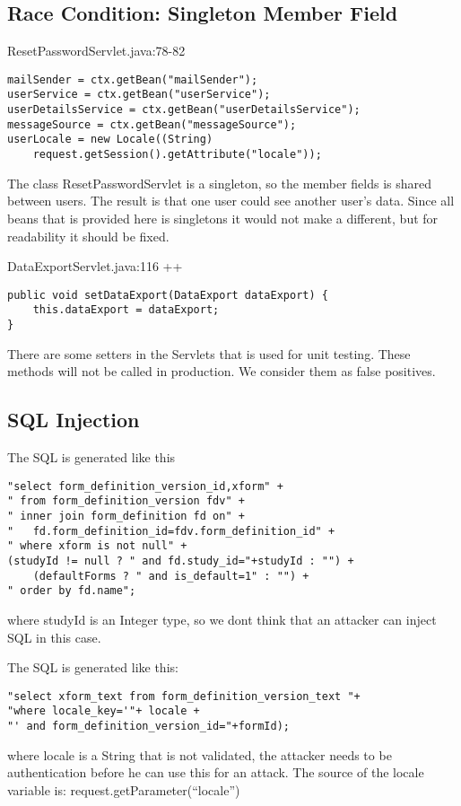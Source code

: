 \documentclass[11pt,a4paper]{article}
\theoremstyle{definition}
\begin{document}
\subsection{Race Condition: Singleton Member Field}
ResetPasswordServlet.java:78-82
\begin{lstlisting}
mailSender = ctx.getBean("mailSender");
userService = ctx.getBean("userService");
userDetailsService = ctx.getBean("userDetailsService");
messageSource = ctx.getBean("messageSource");
userLocale = new Locale((String)
	request.getSession().getAttribute("locale"));
\end{lstlisting}
The class ResetPasswordServlet is a singleton, so the member fields is shared between users.
The result is that one user could see another user's data.
Since all beans that is provided here is singletons it would not make a different, but for readability it should be fixed.


DataExportServlet.java:116 ++
\begin{lstlisting}
public void setDataExport(DataExport dataExport) {
    this.dataExport = dataExport;
}
\end{lstlisting}
There are some setters in the Servlets that is used for unit testing. These methods will not be called in production.
We consider them as false positives.

\subsection{SQL Injection}
The SQL is generated like this
\begin{lstlisting}[caption=HibernateFormDownloadDAO.java:113]
"select form_definition_version_id,xform" +
" from form_definition_version fdv" +
" inner join form_definition fd on" +
"   fd.form_definition_id=fdv.form_definition_id" +
" where xform is not null" +
(studyId != null ? " and fd.study_id="+studyId : "") +
    (defaultForms ? " and is_default=1" : "") +
" order by fd.name";
\end{lstlisting}
where studyId is an Integer type, so we dont think that an attacker can inject SQL in this case.


The SQL is generated like this:
\begin{lstlisting}[caption=HibernateFormDownloadDAO.java:149]
"select xform_text from form_definition_version_text "+
"where locale_key='"+ locale +
"' and form_definition_version_id="+formId);
\end{lstlisting}
where locale is a String that is not validated, the attacker needs to be authentication before he can use this for an attack.
The source of the locale variable is: request.getParameter(``locale'')
\end{document}
